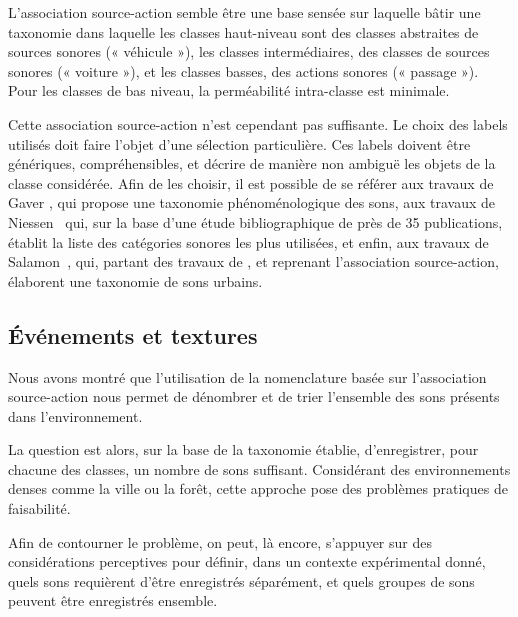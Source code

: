 L'association source-action semble être une base sensée sur laquelle bâtir une taxonomie dans laquelle les classes haut-niveau sont des classes abstraites de sources sonores (« véhicule »), les classes intermédiaires, des classes de sources sonores (« voiture »), et les classes basses, des actions sonores (« passage »). Pour les classes de bas niveau, la perméabilité intra-classe est minimale.

Cette association source-action n'est cependant pas suffisante. Le choix des labels utilisés doit faire l'objet d'une sélection particulière. Ces labels doivent être génériques, compréhensibles, et décrire de manière non ambiguë les objets de la classe considérée. Afin de les choisir, il est possible de se référer aux travaux de Gaver \citep{gaver1993world}, qui propose une taxonomie phénoménologique des sons, aux travaux de Niessen~\al \citep{niessen2010categories} qui, sur la base d'une étude bibliographique de près de 35 publications, établit la liste des catégories sonores les plus utilisées, et enfin, aux travaux de Salamon~\al \citep{Salamon14}, qui, partant des travaux de \citep{brown2011towards}, et reprenant l'association source-action, élaborent une taxonomie de sons urbains.

\subsection{Événements et textures}
\label{sec:ch4_eventTextureAmorphe}

Nous avons montré que l'utilisation de la nomenclature basée sur l’association source-action nous permet de dénombrer et de trier l'ensemble des sons présents dans l'environnement.


La question est alors, sur la base de la taxonomie établie, d'enregistrer, pour chacune des classes, un nombre de sons suffisant. Considérant des environnements denses comme la ville ou la forêt, cette approche pose des problèmes pratiques de faisabilité.

Afin de contourner le problème, on peut, là encore, s’appuyer sur des considérations perceptives pour définir, dans un contexte expérimental donné, quels sons requièrent d'être enregistrés séparément, et quels groupes de sons peuvent être enregistrés ensemble.


